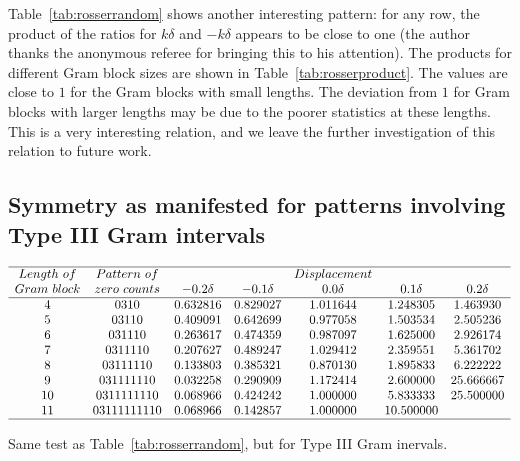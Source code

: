 \documentclass[twoside]{article}
\theoremstyle{definition}
\begin{document}
{ {
Table~\ref{tab:rosserrandom}  shows another interesting pattern: for any row, the product of the ratios for $k\delta$ and $-k\delta$ appears to be close to one 
(the author thanks the anonymous referee for bringing this to his attention). The products for different Gram block sizes are shown in Table~\ref{tab:rosserproduct}. The values are close to $1$ for the Gram blocks with small lengths. The deviation from $1$ for 
Gram blocks with larger lengths may be due to the poorer statistics at these lengths. This is a very interesting relation, and we leave the further investigation of this relation to future work.
}

\subsection{\label{sec6-III}Symmetry as manifested for patterns involving Type III Gram intervals}


\begin{table}
\centering \(\begin{array}{ccccccc}
\hline
Length~of&Pattern~of& &&Displacement \\
Gram~block&zero~counts	& -0.2\delta & -0.1\delta & 0.0\delta & 0.1\delta & 0.2\delta  \\
\hline
4 &0310&0.632816&0.829027&1.011644&1.248305&1.463930 \\
5 &03110&0.409091&0.642699&0.977058&1.503534&2.505236 \\
6 &031110&0.263617&0.474359&0.987097&1.625000&2.926174 \\
7 &0311110&0.207627&0.489247&1.029412&2.359551&5.361702 \\
8 &03111110&0.133803&0.385321&0.870130&1.895833&6.222222 \\
9 &031111110&0.032258&0.290909&1.172414&2.600000&25.666667 \\
10 &0311111110&0.068966&0.424242&1.000000&5.833333&25.500000 \\
11 &03111111110&0.068966&0.142857&1.000000&10.500000& \\
\hline
\end{array}\)
\caption{Same test as Table~\ref{tab:rosserrandom}, but for  Type III Gram inervals. } 
\label{tab:rosser3random}
\end{table}

}
\end{document}
